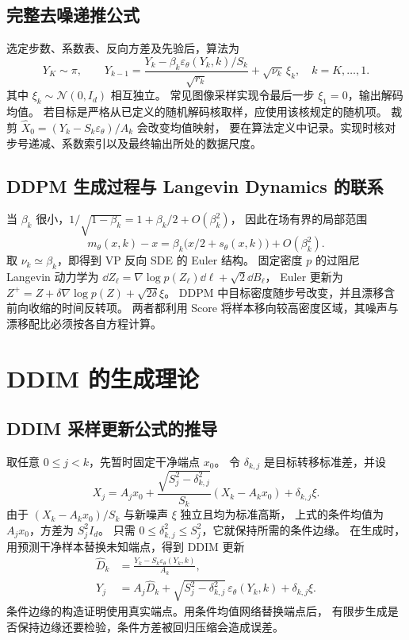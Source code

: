 \subsection{完整去噪递推公式\requiredderivation}

选定步数、系数表、反向方差及先验后，算法为
\begin{equation}
 Y_K\sim\pi,\qquad
 Y_{k-1}=\frac{Y_k-\beta_k\varepsilon_\theta(Y_k,k)/S_k}{\sqrt{r_k}}
             +\sqrt{\nu_k}\,\xi_k,
 \quad k=K,\ldots,1.
 \label{eq:generation-ddpm-sampler}
\end{equation}
其中 \(\xi_k\sim\mathcal N(0,I_d)\) 相互独立。
常见图像采样实现令最后一步 \(\xi_1=0\)，输出解码均值。
若目标是严格从已定义的随机解码核取样，应使用该核规定的随机项。
裁剪 \(\widehat X_0=(Y_k-S_k\varepsilon_\theta)/A_k\) 会改变均值映射，
要在算法定义中记录。实现时核对步号递减、系数索引以及最终输出所处的数据尺度。

\subsection{DDPM 生成过程与 Langevin Dynamics 的联系}

当 \(\beta_k\) 很小，\(1/\sqrt{1-\beta_k}=1+\beta_k/2+O(\beta_k^2)\)，
因此在场有界的局部范围
\[
 m_\theta(x,k)-x
   =\beta_k\bigl(x/2+s_\theta(x,k)\bigr)+O(\beta_k^2).
\]
取 \(\nu_k\simeq\beta_k\)，即得到 VP 反向 SDE 的 Euler 结构。
固定密度 \(p\) 的过阻尼 Langevin 动力学为
\(\dd Z_\ell=\nabla\log p(Z_\ell)\dd\ell+\sqrt2\dd B_\ell\)，
Euler 更新为 \(Z^+=Z+\delta\nabla\log p(Z)+\sqrt{2\delta}\xi\)。
DDPM 中目标密度随步号改变，并且漂移含前向收缩的时间反转项。
两者都利用 Score 将样本移向较高密度区域，其噪声与漂移配比必须按各自方程计算。

\section{DDIM 的生成理论}
\label{sec:generation-ddim}

\subsection{DDIM 采样更新公式的推导\requiredderivation}

取任意 \(0\le j<k\)，先暂时固定干净端点 \(x_0\)。
令 \(\delta_{k,j}\) 是目标转移标准差，并设
\[
 X_j=A_jx_0+\frac{\sqrt{S_j^2-\delta_{k,j}^2}}{S_k}
                       (X_k-A_kx_0)+\delta_{k,j}\xi.
\]
由于 \((X_k-A_kx_0)/S_k\) 与新噪声 \(\xi\) 独立且均为标准高斯，
上式的条件均值为 \(A_jx_0\)，方差为 \(S_j^2I_d\)。
只需 \(0\le\delta_{k,j}^2\le S_j^2\)，它就保持所需的条件边缘。
在生成时，用预测干净样本替换未知端点，得到 DDIM 更新 \cite{song2021ddim}
\begin{equation}
 \begin{aligned}
 \widehat D_k&=\frac{Y_k-S_k\varepsilon_\theta(Y_k,k)}{A_k},\\
 Y_j&=A_j\widehat D_k+
       \sqrt{S_j^2-\delta_{k,j}^2}\,\varepsilon_\theta(Y_k,k)
       +\delta_{k,j}\xi .
 \end{aligned}
 \label{eq:generation-ddim-update}
\end{equation}
条件边缘的构造证明使用真实端点。用条件均值网络替换端点后，
有限步生成是否保持边缘还要检验，条件方差被回归压缩会造成误差。

